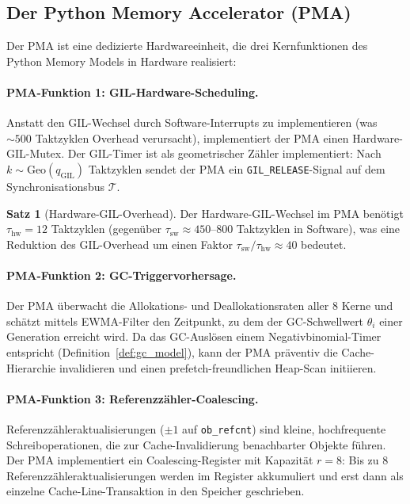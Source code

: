 ﻿\documentclass[a4paper,12pt]{scrreprt}
\theoremstyle{definition}
\newtheorem{satz}{Satz}[section]
\newcommand{\Geo}{\mathrm{Geo}}
\begin{document}
	\subsection{Der Python Memory Accelerator (PMA)}
	
	Der PMA ist eine dedizierte Hardwareeinheit, die drei Kernfunktionen
	des Python Memory Models in Hardware realisiert:
	
	\paragraph{PMA-Funktion 1: GIL-Hardware-Scheduling.}
	Anstatt den GIL-Wechsel durch Software-Interrupts zu implementieren
	(was $\sim 500$ Taktzyklen Overhead verursacht), implementiert der PMA
	einen Hardware-GIL-Mutex. Der GIL-Timer ist als geometrischer Zähler
	implementiert: Nach $k \sim \Geo(q_{\mathrm{GIL}})$ Taktzyklen sendet
	der PMA ein \texttt{GIL\_RELEASE}-Signal auf dem Synchronisationsbus
	$\mathcal{T}$.
	
	\begin{satz}[Hardware-GIL-Overhead]
		\label{satz:hardware_gil}
		Der Hardware-GIL-Wechsel im PMA benötigt $\tau_{\mathrm{hw}} = 12$
		Taktzyklen (gegenüber $\tau_{\mathrm{sw}} \approx 450$--$800$ Taktzyklen
		in Software), was eine Reduktion des GIL-Overhead um einen Faktor
		$\tau_{\mathrm{sw}}/\tau_{\mathrm{hw}} \approx 40$ bedeutet.
	\end{satz}
	
	\paragraph{PMA-Funktion 2: GC-Triggervorhersage.}
	Der PMA überwacht die Allokations- und Deallokationsraten aller 8 Kerne
	und schätzt mittels EWMA-Filter den Zeitpunkt, zu dem der GC-Schwellwert
	$\theta_i$ einer Generation erreicht wird. Da das GC-Auslösen einem
	Negativbinomial-Timer entspricht (Definition~\ref{def:gc_model}), kann
	der PMA präventiv die Cache-Hierarchie invalidieren und einen
	prefetch-freundlichen Heap-Scan initiieren.
	
	\paragraph{PMA-Funktion 3: Referenzzähler-Coalescing.}
	Referenzzähleraktualisierungen ($\pm 1$ auf \texttt{ob\_refcnt}) sind
	kleine, hochfrequente Schreiboperationen, die zur Cache-Invalidierung
	benachbarter Objekte führen. Der PMA implementiert ein Coalescing-Register
	mit Kapazität $r = 8$: Bis zu 8 Referenzzähleraktualisierungen werden
	im Register akkumuliert und erst dann als einzelne Cache-Line-Transaktion
	in den Speicher geschrieben.
	
\end{document}
